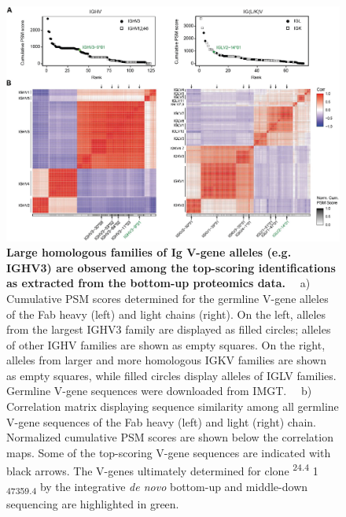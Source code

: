 \begin{subappendices}
  \begin{figure}[!ht]
    \center
    \includegraphics[]{Chapter.3/Figures/fs7.png}
    \caption{
      \textbf{Large homologous families of Ig V-gene alleles (e.g. IGHV3) are observed among the top-scoring identifications as extracted from the bottom-up proteomics data.} ~~a) Cumulative PSM scores determined for the germline V-gene alleles of the Fab heavy (left) and light chains (right). On the left, alleles from the largest IGHV3 family are displayed as filled circles; alleles of other IGHV families are shown as empty squares. On the right, alleles from larger and more homologous IGKV families are shown as empty squares, while filled circles display alleles of IGLV families. Germline V-gene sequences were downloaded from IMGT. ~~b) Correlation matrix displaying sequence similarity among all germline V-gene sequences of the Fab heavy (left) and light (right) chain. Normalized cumulative PSM scores are shown below the correlation maps. Some of the top-scoring V-gene sequences are indicated with black arrows. The V-genes ultimately determined for clone \textsuperscript{24.4} 1 \textsubscript{47359.4} by the integrative \emph{de novo} bottom-up and middle-down sequencing are highlighted in green.
    }
    \label{fig:figs3.7}
  \end{figure}

  \vspace{1cm}


\end{subappendices}
